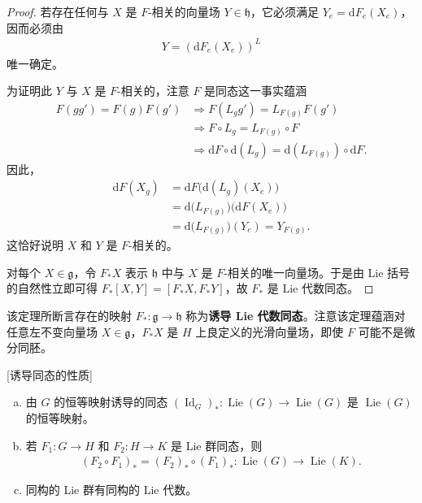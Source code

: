 \documentclass[../../main.tex]{subfiles}
\begin{document}
\begin{proof}
若存在任何与 $X$ 是 $F$-相关的向量场 $Y\in\mathfrak{h}$，它必须满足 $Y_e=\mathrm{d}F_e(X_e)$，因而必须由
\begin{align*}
Y=(\mathrm{d}F_e(X_e))^L
\end{align*}
唯一确定。

为证明此 $Y$ 与 $X$ 是 $F$-相关的，注意 $F$ 是同态这一事实蕴涵
\begin{align*}
F(gg')=F(g)F(g')&\Rightarrow F(L_gg')=L_{F(g)}F(g')\\
&\Rightarrow F\circ L_g=L_{F(g)}\circ F\\
&\Rightarrow \mathrm{d}F\circ\mathrm{d}(L_g)=\mathrm{d}(L_{F(g)})\circ\mathrm{d}F.
\end{align*}
因此，
\begin{align*}
\mathrm{d}F(X_g)&=\mathrm{d}F\bigl(\mathrm{d}(L_g)(X_e)\bigr)\\
&=\mathrm{d}\bigl(L_{F(g)}\bigr)\bigl(\mathrm{d}F(X_e)\bigr)\\
&=\mathrm{d}\bigl(L_{F(g)}\bigr)(Y_e)=Y_{F(g)}.
\end{align*}
这恰好说明 $X$ 和 $Y$ 是 $F$-相关的。

对每个 $X\in\mathfrak{g}$，令 $F_*X$ 表示 $\mathfrak{h}$ 中与 $X$ 是 $F$-相关的唯一向量场。于是由 Lie 括号的自然性立即可得 $F_*[X,Y]=[F_*X,F_*Y]$，故 $F_*$ 是 Lie 代数同态。
\end{proof}

该定理所断言存在的映射 $F_*\colon\mathfrak{g}\to\mathfrak{h}$ 称为\textbf{诱导 Lie 代数同态}。注意该定理蕴涵对任意左不变向量场 $X\in\mathfrak{g}$，$F_*X$ 是 $H$ 上良定义的光滑向量场，即使 $F$ 可能不是微分同胚。

\begin{proposition}\label{proposition:ch08-45}[诱导同态的性质]
\begin{enumerate}[(a)]
\item 由 $G$ 的恒等映射诱导的同态 $(\operatorname{Id}_G)_*\colon\operatorname{Lie}(G)\to\operatorname{Lie}(G)$ 是 $\operatorname{Lie}(G)$ 的恒等映射。
\item 若 $F_1\colon G\to H$ 和 $F_2\colon H\to K$ 是 Lie 群同态，则
\begin{align*}
(F_2\circ F_1)_*=(F_2)_*\circ(F_1)_*\colon\operatorname{Lie}(G)\to\operatorname{Lie}(K).
\end{align*}
\item 同构的 Lie 群有同构的 Lie 代数。
\end{enumerate}
\end{proposition}
\end{document}
